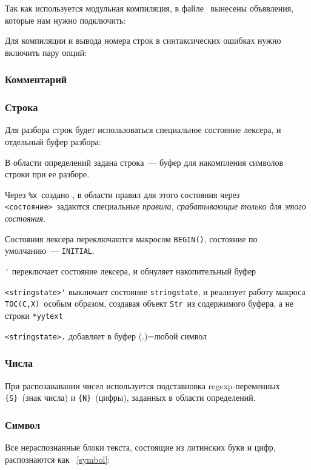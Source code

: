 \label{bilex}

Так как используется модульная компиляция, в файле \ вынесены
объявления, которые нам нужно подключить: 


Для компиляции и вывода номера строк в синтаксических ошибках
нужно включить пару опций:
 

\subsubsection{Комментарий}


\subsubsection{Строка}\label{lexstring}

Для разбора строк будет использоваться специальное состояние лексера,
и отдельный буфер разбора:  


В области определений задана строка\ --- буфер для накомпления символов строки
при ее разборе.

Через \verb|%x|\ создано ,
в области правил для этого состояния через \verb|<состояние>|\ задаются 
специальные \emph{правила, срабатывающие только для этого состояния}.

Состояния лексера переключаются макросом \verb|BEGIN()|, состояние по 
умолчанию\ --- \verb|INITIAL|.

\begin{description}
\item{\verb|'|} переключает состояние лексера, и обнуляет накопительный буфер
\item{\verb|<stringstate>'|} выключает состояние \verb|stringstate|,
и реализует работу макроса \verb|TOC(C,X)|\ особым образом, создавая объект
\verb|Str|\ из содержимого буфера, а не строки \verb|*yytext|
\item{\verb|<stringstate>.|} добавляет в буфер (.)=любой символ
\end{description}

\subsubsection{Числа}\label{lexnumbers}


При распозанавании чисел используется подставновка regexp-переменных
\verb|{S}|\ (знак числа) и \verb|{N}|\ (цифры), заданных в области определений. 

\subsubsection{Символ}\label{lexsymbol}

Все нераспознанные блоки текста, состоящие из литинских букв и цифр,
распознаются как \ \ref{symbol}:

